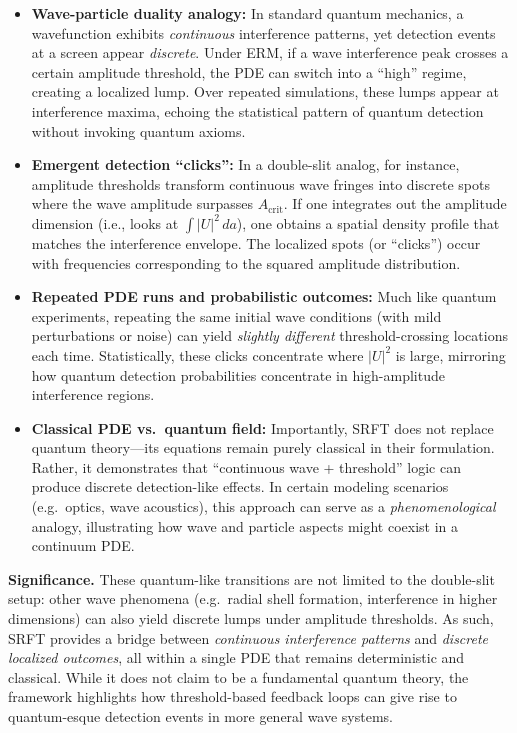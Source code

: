 \documentclass[12pt]{article}
\begin{document}
\begin{itemize}
    \item \textbf{Wave-particle duality analogy:} 
    In standard quantum mechanics, a wavefunction exhibits \emph{continuous} interference
    patterns, yet detection events at a screen appear \emph{discrete}. 
    Under ERM, if a wave interference peak crosses a certain amplitude threshold, 
    the PDE can switch into a “high” regime, creating a localized lump. Over repeated
    simulations, these lumps appear at interference maxima, echoing the statistical 
    pattern of quantum detection without invoking quantum axioms.

    \item \textbf{Emergent detection ``clicks'':}
    In a double-slit analog, for instance, amplitude thresholds transform continuous 
    wave fringes into discrete spots where the wave amplitude surpasses 
    $A_{\mathrm{crit}}$. If one integrates out the amplitude dimension 
    (i.e., looks at $\int |U|^2\,da$), one obtains a spatial density profile 
    that matches the interference envelope. The localized spots (or “clicks”) 
    occur with frequencies corresponding to the squared amplitude distribution.

    \item \textbf{Repeated PDE runs and probabilistic outcomes:}
    Much like quantum experiments, repeating the same initial wave conditions 
    (with mild perturbations or noise) can yield \emph{slightly different} 
    threshold-crossing locations each time. Statistically, these clicks concentrate 
    where $|U|^2$ is large, mirroring how quantum detection probabilities 
    concentrate in high-amplitude interference regions.

    \item \textbf{Classical PDE vs.\ quantum field:}
    Importantly, SRFT does not replace quantum theory—its equations remain 
    purely classical in their formulation. Rather, it demonstrates that 
    “continuous wave + threshold” logic can produce discrete detection-like 
    effects. In certain modeling scenarios (e.g.\ optics, wave acoustics), 
    this approach can serve as a \emph{phenomenological} analogy, illustrating 
    how wave and particle aspects might coexist in a continuum PDE.

\end{itemize}

\noindent
\textbf{Significance.}
These quantum-like transitions are not limited to the double-slit setup: other
wave phenomena (e.g.\ radial shell formation, interference in higher dimensions)
can also yield discrete lumps under amplitude thresholds. As such, SRFT provides
a bridge between \emph{continuous interference patterns} and \emph{discrete 
localized outcomes}, all within a single PDE that remains deterministic and 
classical. While it does not claim to be a fundamental quantum theory, the
framework highlights how threshold-based feedback loops can give rise to 
quantum-esque detection events in more general wave systems.
\end{document}
